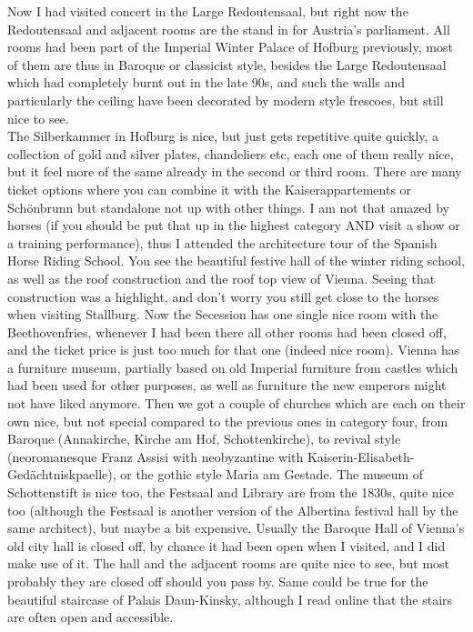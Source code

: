 Now I had visited concert in the Large Redoutensaal, but right now the Redoutensaal and adjacent rooms are the stand in for Austria's parliament. All rooms had been part of the Imperial Winter Palace of Hofburg previously, most of them are thus in Baroque or classicist style, besides the Large Redoutensaal which had completely burnt out in the late 90s, and such the walls and particularly the ceiling have been decorated by modern style frescoes, but still nice to see.\\

The Silberkammer in Hofburg is nice, but just gets repetitive quite quickly, a collection of gold and silver plates, chandeliers etc, each one of them really nice, but it feel more of the same already in the second or third room. There are many ticket options where you can combine it with the Kaiserappartements or Sch\"onbrunn but standalone not up with other things. I am not that amazed by horses (if you should be put that up in the highest category AND visit a show or a training performance), thus I attended the architecture tour of the Spanish Horse Riding School. You see the beautiful festive hall of the winter riding school, as well as the roof construction and the roof top view of Vienna. Seeing that construction was a highlight, and don't worry you still get close to the horses when visiting Stallburg. Now the Secession has one single nice room with the Beethovenfries, whenever I had been there all other rooms had been closed off, and the ticket price is just too much for that one (indeed nice room). Vienna has a furniture museum, partially based on old Imperial furniture from castles which had been used for other purposes, as well as furniture the new emperors might not have liked anymore. Then we got a couple of churches which are each on their own nice, but not special compared to the previous ones in category four, from Baroque (Annakirche, Kirche am Hof, Schottenkirche), to revival style (neoromanesque Franz Assisi with neobyzantine with Kaiserin-Elisabeth-Ged\"achtniskpaelle), or the gothic style Maria am Gestade. The museum of Schottenstift is nice too, the Festsaal and Library are from the 1830s, quite nice too (although the Festsaal is another version of the Albertina festival hall by the same architect), but maybe a bit expensive. Usually the Baroque Hall of Vienna's old city hall is closed off, by chance it had been open when I visited, and I did make use of it. The hall and the adjacent rooms are quite nice to see, but most probably they are closed off should you pass by. Same could be true for the beautiful staircase of Palais Daun-Kinsky, although I read online that the stairs are often open and accessible.\\
